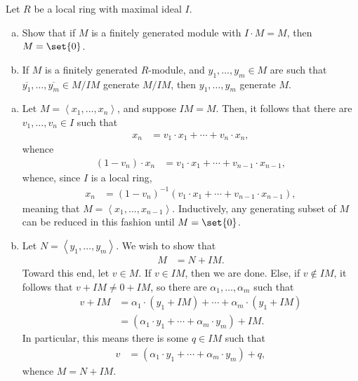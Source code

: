 \documentclass[10pt]{mypackage}
\begin{document}
\begin{problem}[Problem 4]
  Let $R$ be a local ring with maximal ideal $I$.
  \begin{enumerate}[(a)]
    \item Show that if $M$ is a finitely generated module with $I\cdot M = M$, then $M = \set{0}$.
    \item If $M$ is a finitely generated $R$-module, and $y_1,\dots,y_m\in M$ are such that $ \overline{y_1},\dots, \overline{y_m}\in M/IM $ generate $M/IM$, then $y_1,\dots,y_m$ generate $M$.
  \end{enumerate}
\end{problem}
\begin{solution}\hfill
  \begin{enumerate}[(a)]
    \item Let $M = \left\langle x_1,\dots,x_n \right\rangle$, and suppose $IM = M$. Then, it follows that there are $v_1,\dots,v_n\in I$ such that
      \begin{align*}
        x_n &= v_1\cdot x_1 + \cdots + v_n\cdot x_n,
      \end{align*}
      whence
      \begin{align*}
        \left( 1 - v_n \right)\cdot x_n &= v_1\cdot x_1 + \cdots + v_{n-1}\cdot x_{n-1},
      \end{align*}
      whence, since $I$ is a local ring,
      \begin{align*}
        x_n &= \left( 1-v_n \right)^{-1}\left( v_1\cdot x_1 + \cdots + v_{n-1}\cdot x_{n-1} \right),
      \end{align*}
      meaning that $M = \left\langle x_1,\dots,x_{n-1} \right\rangle$. Inductively, any generating subset of $M$ can be reduced in this fashion until $M = \set{0}$.
    \item Let $N = \left\langle y_1,\dots,y_m \right\rangle$. We wish to show that
      \begin{align*}
        M &= N + IM.
      \end{align*}
      Toward this end, let $v\in M$. If $v\in IM$, then we are done. Else, if $v\notin IM$, it follows that $ v + IM \neq 0 + IM $, so there are $\alpha_1,\dots,\alpha_m$ such that
      \begin{align*}
        v + IM &= \alpha_1\cdot \left( y_1 + IM \right) + \cdots + \alpha_m\cdot \left( y_1 + IM \right)\\
               &= \left( \alpha_1\cdot y_1 + \cdots + \alpha_m\cdot y_m \right) + IM.
      \end{align*}
      In particular, this means there is some $q\in IM$ such that
      \begin{align*}
        v &= \left( \alpha_1\cdot y_1 + \cdots + \alpha_m\cdot y_m \right) + q,
      \end{align*}
      whence $M = N + IM$.\newline


\end{enumerate}
\end{solution}
\end{document}
